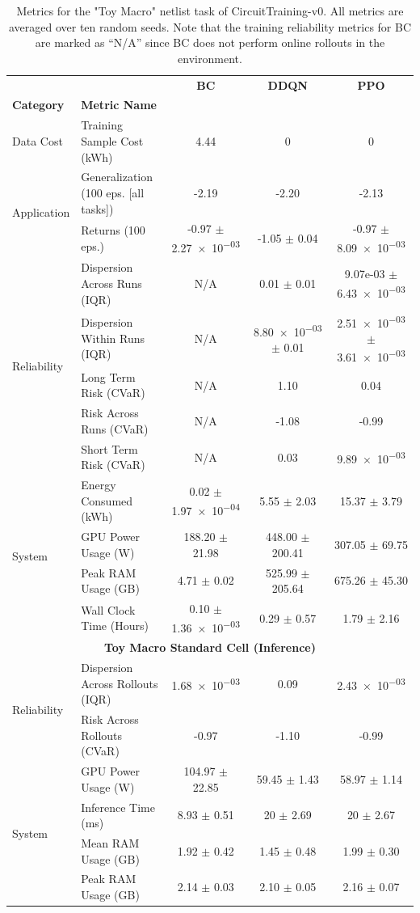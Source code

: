 \begin{table}[!htbp]
{\begin{tabular}{|l|l|c|c|c|}
 &  & \textbf{BC} & \textbf{DDQN} & \textbf{PPO} \\
\textbf{Category} & \textbf{Metric Name} &  &  &  \\
\midrule
\multirow[t]{1}{*}{Data Cost} & Training Sample Cost (kWh) & 4.44 & 0 & 0 \\
\midrule
\multirow[t]{2}{*}{Application} & Generalization (100 eps. [all tasks]) & -2.19 & -2.20 & -2.13 \\
 & Returns (100 eps.) & -0.97 $\pm$ \num{2.27e-03} & -1.05 $\pm$ 0.04 & -0.97 $\pm$ \num{8.09e-03} \\
\cline{1-5}
\multirow[t]{5}{*}{Reliability} & Dispersion Across Runs (IQR) & N/A & 0.01 $\pm$ 0.01 & 9.07e-03 $\pm$ \num{6.43e-03} \\
 & Dispersion Within Runs (IQR) & N/A & \num{8.80e-03} $\pm$ 0.01 & \num{2.51e-03} $\pm$ \num{3.61e-03} \\
 & Long Term Risk (CVaR) & N/A & 1.10 & 0.04 \\
 & Risk Across Runs (CVaR) & N/A & -1.08 & -0.99 \\
 & Short Term Risk (CVaR) & N/A & 0.03 & \num{9.89e-03} \\
\cline{1-5}
\multirow[t]{4}{*}{System} & Energy Consumed (kWh) & 0.02 $\pm$ \num{1.97e-04} & 5.55 $\pm$ 2.03 & 15.37 $\pm$ 3.79 \\
 & GPU Power Usage (W) & 188.20 $\pm$ 21.98 & 448.00 $\pm$ 200.41 & 307.05 $\pm$ 69.75 \\
 & Peak RAM Usage (GB) & 4.71 $\pm$ 0.02 & 525.99 $\pm$ 205.64 & 675.26 $\pm$ 45.30 \\
 & Wall Clock Time (Hours) & 0.10 $\pm$ \num{1.36e-03} & 0.29 $\pm$ 0.57 & 1.79 $\pm$ 2.16 \\
\cline{1-5}
\midrule
\multicolumn{5}{|c|}{\textbf{Toy Macro Standard Cell (Inference)}} \\
\multirow[t]{2}{*}{Reliability} & Dispersion Across Rollouts (IQR) & \num{1.68e-03} & 0.09 & \num{2.43e-03} \\
 & Risk Across Rollouts (CVaR) & -0.97 & -1.10 & -0.99 \\
\cline{1-5}
\multirow[t]{4}{*}{System} & GPU Power Usage (W) & 104.97 $\pm$ 22.85 & 59.45 $\pm$ 1.43 & 58.97 $\pm$ 1.14 \\
 & Inference Time (ms) & 8.93 $\pm$ 0.51 & 20 $\pm$ 2.69 & 20 $\pm$ 2.67 \\
 & Mean RAM Usage (GB) & 1.92 $\pm$ 0.42 & 1.45 $\pm$ 0.48 & 1.99 $\pm$ 0.30 \\
 & Peak RAM Usage (GB) & 2.14 $\pm$ 0.03 & 2.10 $\pm$ 0.05 & 2.16 $\pm$ 0.07 \\
\bottomrule
\end{tabular}
}

\caption{Metrics for the "Toy Macro" netlist task of CircuitTraining-v0. All metrics are averaged over ten random seeds. Note that the training reliability metrics for BC are marked as ``N/A'' since BC does not perform online rollouts in the environment.}
\label{tab:appendix_metrics_circuit_training_toy_macro_stdcell}
\end{table}


